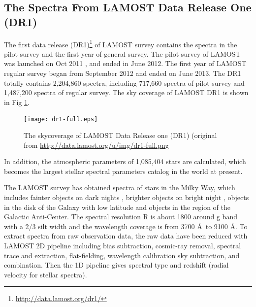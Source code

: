 \documentclass[referee]{raa}            %
\begin{document}
\subsection{The Spectra From LAMOST Data Release One (DR1)}
The first data release (DR1)\footnote{\url{http://data.lamost.org/dr1/}} of LAMOST survey contains the spectra in the pilot survey and the first year of general survey.
The pilot survey of LAMOST  was launched on Oct 2011 , and ended in June 2012.%
The first year of LAMOST regular survey began from September 2012 and ended on June 2013.
The DR1 totally contains 2,204,860 spectra, including 717,660 spectra of pilot survey and 1,487,200 spectra of regular survey.
The sky coverage of LAMOST DR1 is shown in Fig \ref{Fig_all}.
 \begin{figure}
   \centering
   \texttt{[image: dr1-full.eps]}
   \caption{The skycoverage of LAMOST Data Release one (DR1) (original from \url{http://data.lamost.org/u/img/dr1-full.png}
   }
   \label{Fig_all}
   \end{figure}
In addition, the atmospheric parameters of 1,085,404 stars are calculated, which becomes the largest stellar spectral parameters catalog in the world at present.

The LAMOST survey has obtained spectra of stars in the Milky Way,
which includes fainter objects on dark nights \citep{yang2012legue,carlin2012algorithm},
brighter objects on bright night \citep{zhang2012legue},
objects in the disk of the Galaxy with low latitude \citep{chen2012legue} and objects in the region of the Galactic Anti-Center\citep{liu2013lss}.
The spectral resolution R is about 1800 around g band with a 2/3 silt width \citep{wang2013effects} and the wavelength coverage is from 3700 \AA\  to 9100 \AA.
To extract spectra from raw observation data, the raw data have been reduced with LAMOST 2D pipeline\citep{bai2012lamost} including bias subtraction, cosmic-ray removal, spectral trace and extraction, flat-fielding, wavelength calibration sky subtraction, and combination.
Then the 1D pipeline\citep{wang2010calibration,luo2012data} gives spectral type and redshift (radial velocity
 for stellar spectra).
\end{document}
